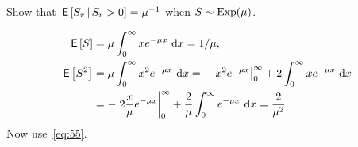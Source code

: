 \begin{extra}
 Show that $\,\mathsf{E}\left[S_r\,\middle|\, S_r>0\right] = \mu^{-1}$ when $S\sim \operatorname{Exp}(\mu)$.
\begin{solution}
 \begin{align*}
\,\mathsf{E}\left[S\right] &= \mu \int_0^\infty x e^{-\mu x}\,\,\text{d}x = 1/\mu, \\
\,\mathsf{E}\left[S^2\right] 
&= \mu \int_0^\infty x^2 e^{- \mu x} \,\,\text{d}x = - \left. x^2 e^{-\mu x} \right|_0^\infty + 2 \int_0^\infty x e^{-\mu x} \, \,\text{d}x \\
&= -\left. 2\frac x \mu e^{-\mu x} \right|_0^\infty + \frac 2 \mu\int_0^\infty e^{-\mu x} \, \,\text{d}x =\frac2{\mu^2}.
 \end{align*}
Now use~\cref{eq:55}.
\end{solution}
\end{extra}








